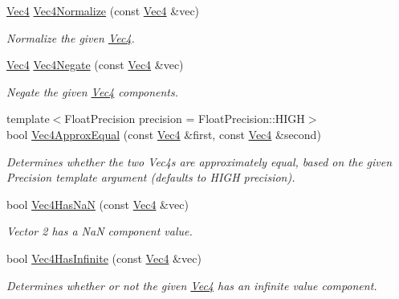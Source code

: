 \begin{DoxyCompactItemize}
\hyperlink{classgofxmath_1_1_vec4}{Vec4} \hyperlink{classgofxmath_1_1_vec4_af1fa3fbf9843a509f3b8a476aa18361b}{Vec4\+Normalize} (const \hyperlink{classgofxmath_1_1_vec4}{Vec4} \&vec)
\begin{DoxyCompactList}\small\item\em Normalize the given \hyperlink{classgofxmath_1_1_vec4}{Vec4}. \end{DoxyCompactList}\item 
\hyperlink{classgofxmath_1_1_vec4}{Vec4} \hyperlink{classgofxmath_1_1_vec4_a9ba6951d54c6a4d9d513580f5bf3b928}{Vec4\+Negate} (const \hyperlink{classgofxmath_1_1_vec4}{Vec4} \&vec)
\begin{DoxyCompactList}\small\item\em Negate the given \hyperlink{classgofxmath_1_1_vec4}{Vec4} components. \end{DoxyCompactList}\item 
{\footnotesize template$<$Float\+Precision precision = Float\+Precision\+::\+H\+I\+G\+H$>$ }\\bool \hyperlink{classgofxmath_1_1_vec4_a819b8c958e12f0838288c641af7e1ab6}{Vec4\+Approx\+Equal} (const \hyperlink{classgofxmath_1_1_vec4}{Vec4} \&first, const \hyperlink{classgofxmath_1_1_vec4}{Vec4} \&second)
\begin{DoxyCompactList}\small\item\em Determines whether the two Vec4s are approximately equal, based on the given Precision template argument (defaults to H\+I\+G\+H precision). \end{DoxyCompactList}\item 
bool \hyperlink{classgofxmath_1_1_vec4_ab82fdfebe73934664b56e9ba1174f37f}{Vec4\+Has\+Na\+N} (const \hyperlink{classgofxmath_1_1_vec4}{Vec4} \&vec)
\begin{DoxyCompactList}\small\item\em Vector 2 has a Na\+N component value. \end{DoxyCompactList}\item 
bool \hyperlink{classgofxmath_1_1_vec4_a29cd467d514b701c3a796cb75234be0b}{Vec4\+Has\+Infinite} (const \hyperlink{classgofxmath_1_1_vec4}{Vec4} \&vec)
\begin{DoxyCompactList}\small\item\em Determines whether or not the given \hyperlink{classgofxmath_1_1_vec4}{Vec4} has an infinite value component. \end{DoxyCompactList}\end{DoxyCompactItemize}



